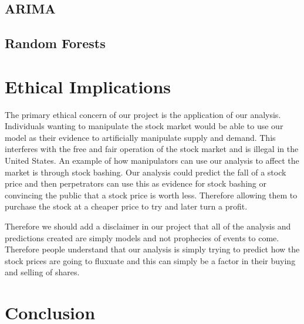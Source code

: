 \documentclass[12pt]{article}
\begin{document}
\subsection{ARIMA}

\subsection{Random Forests}


\section{Ethical Implications}

The primary ethical concern of our project is the application of our analysis. Individuals wanting to manipulate the stock market would be able to use our model as their evidence to artificially manipulate supply and demand. This interferes with the free and fair operation of the stock market and is illegal in the United States. An example of how manipulators can use our analysis to affect the market is through stock bashing. Our analysis could predict the fall of a stock price and then perpetrators can use this as evidence for stock bashing or convincing the public that a stock price is worth less. Therefore allowing them to purchase the stock at a cheaper price to try and later turn a profit. \par
Therefore we should add a disclaimer in our project that all of the analysis and predictions created are simply models and not prophecies of events to come. Therefore people understand that our analysis is simply trying to predict how the stock prices are going to fluxuate and this can simply be a factor in their buying and selling of shares.
\section{Conclusion}
\end{document}
